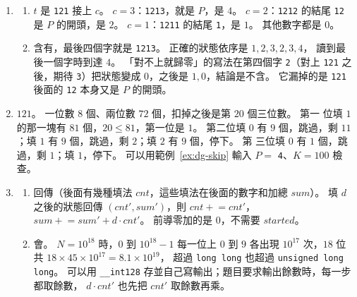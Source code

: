 \begin{enumerate}
\item
\begin{enumerate}
\item $t$ 是 \texttt{121} 接上 $c$。 $c = 3$：\texttt{1213}，就是 $P$，是
$4$。 $c = 2$：\texttt{1212} 的結尾 \texttt{12} 是 $P$ 的開頭，是 $2$。
$c = 1$：\texttt{1211} 的結尾 \texttt{1}，是 $1$。 其他數字都是 $0$。
\item 含有，最後四個字就是 \texttt{1213}。 正確的狀態依序是 $1, 2, 3, 2, 3, 4$，
讀到最後一個字時到達 $4$。 「對不上就歸零」的寫法在第四個字 \texttt{2}（對上
\texttt{121} 之後，期待 \texttt{3}）把狀態變成 $0$，之後是 $1, 0$，結論是不含。
它漏掉的是 \texttt{121} 後面的 \texttt{12} 本身又是 $P$ 的開頭。
\end{enumerate}

\item $121$。 一位數 $8$ 個、兩位數 $72$ 個，扣掉之後是第 $20$ 個三位數。 第一
位填 $1$ 的那一塊有 $81$ 個，$20 \le 81$，第一位是 $1$。 第二位填 $0$ 有 $9$
個，跳過，剩 $11$；填 $1$ 有 $9$ 個，跳過，剩 $2$；填 $2$ 有 $9$ 個，停下。 第
三位填 $0$ 有 $1$ 個，跳過，剩 $1$；填 $1$，停下。 可以用範例~\ref{ex:dg-skip}
輸入 $P =$ \texttt{4}、$K = 100$ 檢查。

\item
\begin{enumerate}
\item 回傳（後面有幾種填法 $\mathit{cnt}$，這些填法在後面的數字和加總
$\mathit{sum}$）。 填 $d$ 之後的狀態回傳 $(\mathit{cnt}', \mathit{sum}')$，則
$\mathit{cnt} \mathrel{+}= \mathit{cnt}'$，$\mathit{sum} \mathrel{+}=
\mathit{sum}' + d \cdot \mathit{cnt}'$。 前導零加的是 $0$，不需要
$\mathit{started}$。
\item 會。 $N = 10^{18}$ 時，$0$ 到 $10^{18} - 1$ 每一位上 $0$ 到 $9$ 各出現
$10^{17}$ 次，$18$ 位共 $18 \times 45 \times 10^{17} = 8.1 \times 10^{19}$，
超過 \texttt{long long} 也超過 \texttt{unsigned long long}。 可以用
\texttt{\_\_int128} 存並自己寫輸出；題目要求輸出餘數時，每一步都取餘數，
$d \cdot \mathit{cnt}'$ 也先把 $\mathit{cnt}'$ 取餘數再乘。
\end{enumerate}
\end{enumerate}
